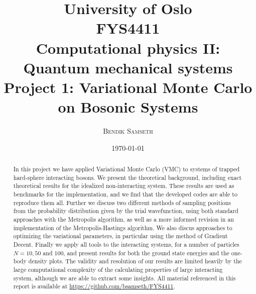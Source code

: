 \documentclass[a4paper, 11pt]{article}
\title{ \small
University of Oslo\\
FYS4411\\
Computational physics II: Quantum mechanical systems\\
\huge Project 1: Variational Monte Carlo on Bosonic Systems}
\author{\textsc{Bendik Samseth}}
\date{\today}
\begin{document}
\maketitle

\begin{abstract}
    In this project we have applied Variational Monte Carlo (VMC) to systems of
    trapped hard-sphere interacting bosons. We present the theoretical
    background, including exact theoretical results for the idealized
    non-interacting system. These results are used as benchmarks for the
    implementation, and we find that the developed codes are able to reproduce
    them all. Further we discuss two different methods of sampling positions
    from the probability distribution given by the trial wavefunction, using
    both standard approaches with the Metropolis algorithm, as well as a more
    informed revision in an implementation of the Metropolis-Hastings algorithm.
    We also discus approaches to optimizing the variational parameters, in
    particular using the method of Gradient Decent. Finally we apply all tools
    to the interacting systems, for a number of particles $N=10, 50$ and $100$,
    and present results for both the ground state energies and the one-body
    density plots. The validity and resolution of our results are limited
    heavily by the large computational complexity of the calculating properties
    of large interacting system, although we are able to extract some insights.
    All material referenced in this report is available at
    \url{https://github.com/bsamseth/FYS4411}.
\end{abstract}


\pagebreak
{}
\tableofcontents
\end{document}
